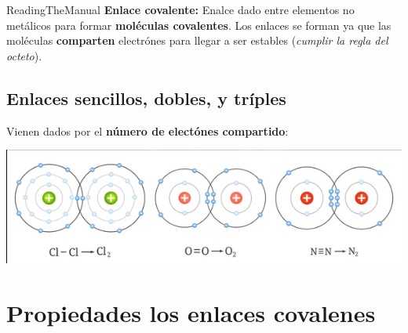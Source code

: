 \documentclass{book}
\begin{document}
\begin{Definition}{}{ReadingTheManual}
  \textbf{Enlace covalente:} Enalce dado entre elementos no metálicos para formar \textbf{moléculas covalentes}. Los enlaces se forman ya que las moléculas \textbf{comparten} 
  electrónes para llegar a ser estables (\textit{cumplir la regla del octeto}).
\end{Definition}

\subsection{Enlaces sencillos, dobles, y tríples}

Vienen dados por el \textbf{número de electónes compartido}:

\includegraphics[scale=0.65]{enlaces-por-complejidad.png}

\section{Propiedades los enlaces covalenes}
\end{document}
